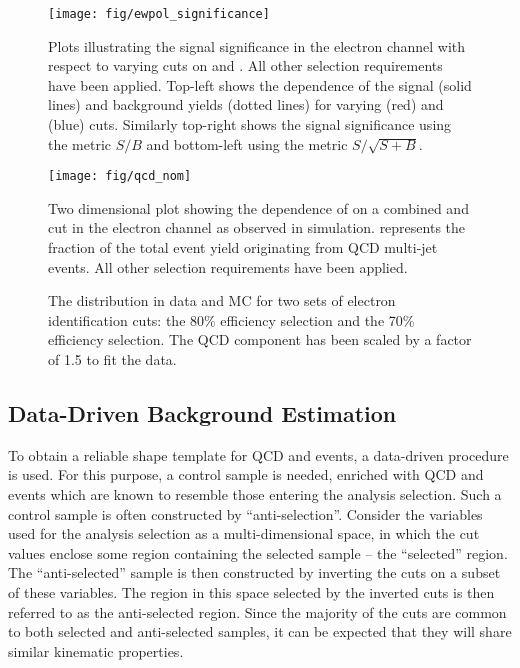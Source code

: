 \begin{figure}[h!]
\texttt{[image: fig/ewpol\_significance]}
\caption[Plots illustrating the signal significance in the electron
channel]{Plots illustrating the signal significance in the electron channel with
  respect to varying cuts on \MET and \MT. All other selection requirements have
  been applied. Top-left shows the dependence of the signal (solid lines) and
  background yields (dotted lines) for varying \MET (red) and \MT (blue)
  cuts. Similarly top-right shows the signal significance using the metric $S/B$
  and bottom-left using the metric $S/\sqrt{S+B}$.}
\label{fig:wpol_ele_significance}
\end{figure}

\begin{figure}[h!]
\texttt{[image: fig/qcd\_nom]}
\caption[The dependence of \fQCD on a combined \MET and \MT cut]{Two dimensional
  plot showing the dependence of \fQCD on a combined \MET and \MT cut in the
  electron channel as observed in simulation. \fQCD represents the fraction of
  the total event yield originating from \ac{QCD} multi-jet events. All other
  selection requirements have been applied. }
\label{fig:wpol_met_mt_fqcd}
\end{figure}


\begin{figure}[h!]
\centering
{}\quad
{}
\caption[The \LP distribution for two sets of electron identification cuts]{The
  \Pep \LP distribution in data and \ac{MC} for two sets of electron identification
  cuts:  the 80\% efficiency selection and
   the 70\% efficiency selection. The \ac{QCD} component has been scaled by a factor of
  1.5 to fit the data.}
\label{fig:wpol_wp80_vs_wp70}
\end{figure}

\subsection{Data-Driven Background Estimation}
\label{sec:wpol_data_driven_bg}
To obtain a reliable shape template for \ac{QCD} and \gammajets events, a
data-driven procedure is used. For this purpose, a control sample is needed,
enriched with \ac{QCD} and \gammajets events which are known to resemble those
entering the analysis selection. Such a control sample is often constructed by
``anti-selection''. Consider the variables used for the analysis selection as a
multi-dimensional space, in which the cut values enclose some region containing
the selected sample -- the ``selected'' region. The ``anti-selected'' sample is
then constructed by inverting the cuts on a subset of these variables. The
region in this space selected by the inverted cuts is then referred to as the
anti-selected region. Since the majority of the cuts are common to both selected
and anti-selected samples, it can be expected that they will share similar
kinematic properties.

